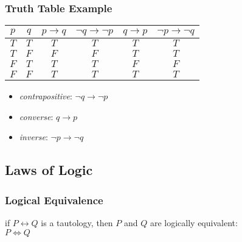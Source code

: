 \documentclass[dvipsnames]{beamer}
\begin{document}
\begin{frame}
  \frametitle{Truth Table Example}

  \begin{example}[$p \rightarrow q$]
    \begin{center}
      \begin{tabular}{|c|c||c|c|c|c|}\hline
        $p$ & $q$ & $p \rightarrow q$ & $\neg q \rightarrow \neg p$ &
                    $q \rightarrow p$ & $\neg p \rightarrow \neg q$\\\hline\hline
        $T$ & $T$ & $T$ & $T$ & $T$ & $T$\\\hline
        $T$ & $F$ & $F$ & $F$ & $T$ & $T$\\\hline
        $F$ & $T$ & $T$ & $T$ & $F$ & $F$\\\hline
        $F$ & $F$ & $T$ & $T$ & $T$ & $T$\\\hline
      \end{tabular}
    \end{center}

    \pause
    \begin{itemize}
      \item \emph{contrapositive}: $\neg q \rightarrow \neg p$

      \pause
      \item \emph{converse}: $q \rightarrow p$

      \pause
      \item \emph{inverse}: $\neg p \rightarrow \neg q$
    \end{itemize}
  \end{example}
\end{frame}

\subsection{Laws of Logic}

\begin{frame}
  \frametitle{Logical Equivalence}

  \begin{definition}
    if $P \leftrightarrow Q$ is a tautology, then $P$ and $Q$ are
    \alert{logically equivalent}:\\
    $P \Leftrightarrow Q$
  \end{definition}
\end{frame}
\end{document}
